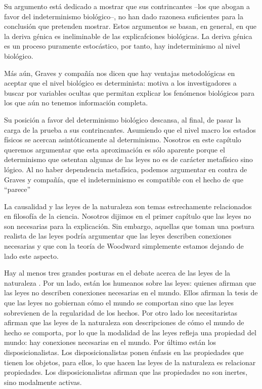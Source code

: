 Su argumento está dedicado a mostrar que sus contrincantes --los que abogan a favor del indeterminismo biológico--, no han dado razonesa suficientes para la conclusión que pretenden mostrar. Estos argumentos se basan, en general, en que la deriva génica es ineliminable de las explicafciones biológicas. La deriva génica es un proceso puramente estocástico, por tanto, hay indeterminismo al nivel biológico.

Más aún, Graves y compañía nos dicen que hay ventajas metodológicas en aceptar que el nivel biológico es determinista: motiva a los investigadores a buscar por variables ocultas que permitan explicar los fenómenos biológicos para los que aún no tenemos información completa.

Su posición a favor del determinismo biológico descansa, al final, de pasar la carga de la prueba a sus contrincantes. Asumiendo que el nivel macro los estados físicos se acercan asintóticamente al determinismo. Nosotros en este capítulo queremos argumentar que esta aproximación es sólo aparente porque el determinismo que ostentan algunas de las leyes no es de carácter metafísico sino lógico. Al no haber dependencia metafísica, podemos argumentar en contra de Graves y compañía, que el indeterminismo es compatible con el hecho de que ``parece''

La causalidad y las leyes de la naturaleza son temas estrechamente relacionados en filosofía de la ciencia. Nosotros dijimos en el primer capítulo que las leyes no son necesarias para la explicación. Sin embargo, aquellas que toman una postura realista de las leyes podría argumentar que las leyes describen conexiones necesarias y que con la teoría de Woodward simplemente estamos dejando de lado este aspecto.

Hay al menos tres grandes posturas en el debate acerca de las leyes de la naturaleza \cite{Borge2019}. Por un lado, están los humeanos sobre las leyes: quienes afirman que las leyes no describen conexiones necesarias en el mundo. Ellos afirman la tesis de que las leyes no gobiernan cómo el mundo se comportan sino que las leyes sobrevienen de la regularidad de los hechos. Por otro lado los necesitaristas afirman que las leyes de la naturaleza son descripciones de cómo el mundo de hecho se comporta, por lo que la modalidad de las leyes refleja una propiedad del mundo: hay conexiones necesarias en el mundo. Por último están los disposicionalistas. Los disposicionalistas ponen énfasis en las propiedades que tienen los objetos, para ellos, lo que hacen las leyes de la naturaleza es relacionar propiedades. Los disposicionalistas afirman que las propiedades no son inertes, sino modalmente activas.

